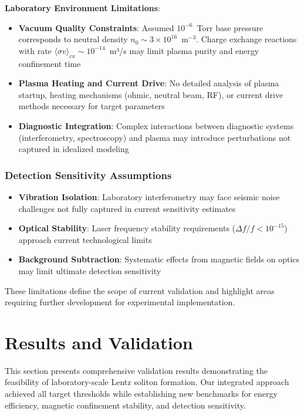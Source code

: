 \documentclass[12pt,a4paper]{article}
\begin{document}
\textbf{Laboratory Environment Limitations}:
\begin{itemize}
\item \textbf{Vacuum Quality Constraints}: Assumed $10^{-6}$~Torr base pressure corresponds to neutral density $n_0 \sim 3 \times 10^{16}$~m$^{-3}$. Charge exchange reactions with rate $\langle\sigma v\rangle_{cx} \sim 10^{-14}$~m³/s may limit plasma purity and energy confinement time
\item \textbf{Plasma Heating and Current Drive}: No detailed analysis of plasma startup, heating mechanisms (ohmic, neutral beam, RF), or current drive methods necessary for target parameters
\item \textbf{Diagnostic Integration}: Complex interactions between diagnostic systems (interferometry, spectroscopy) and plasma may introduce perturbations not captured in idealized modeling
\end{itemize}

\subsubsection{Detection Sensitivity Assumptions}
\begin{itemize}
\item \textbf{Vibration Isolation}: Laboratory interferometry may face seismic noise challenges not fully captured in current sensitivity estimates
\item \textbf{Optical Stability}: Laser frequency stability requirements ($\Delta f/f < 10^{-15}$) approach current technological limits
\item \textbf{Background Subtraction}: Systematic effects from magnetic fields on optics may limit ultimate detection sensitivity
\end{itemize}

These limitations define the scope of current validation and highlight areas requiring further development for experimental implementation.

\section{Results and Validation}

This section presents comprehensive validation results demonstrating the feasibility of laboratory-scale Lentz soliton formation. Our integrated approach achieved all target thresholds while establishing new benchmarks for energy efficiency, magnetic confinement stability, and detection sensitivity.
\end{document}
